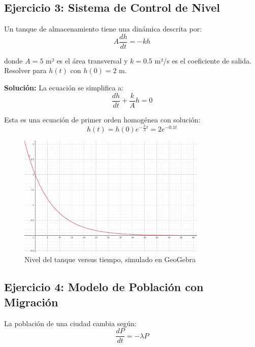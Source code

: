 \documentclass[12pt]{article}
\begin{document}
\subsection{Ejercicio 3: Sistema de Control de Nivel}

Un tanque de almacenamiento tiene una dinámica descrita por:
\begin{equation}
    A \frac{dh}{dt} = -k h
\end{equation}

donde $A = 5$ m² es el área transversal y $k = 0.5$ m²/s es el coeficiente de salida. Resolver para $h(t)$ con $h(0) = 2$ m.

\textbf{Solución:}
La ecuación se simplifica a:
\begin{equation}
    \frac{dh}{dt} + \frac{k}{A} h = 0
\end{equation}

Esta es una ecuación de primer orden homogénea con solución:
\begin{equation}
    h(t) = h(0) e^{-\frac{k}{A}t} = 2 e^{-0.1t}
\end{equation}

\begin{figure}[H]
    \centering
    \includegraphics[width=0.8\textwidth]{imagen-ejercicio3.png}
    \caption{Nivel del tanque versus tiempo, simulado en GeoGebra}
\end{figure}

\subsection{Ejercicio 4: Modelo de Población con Migración}

La población de una ciudad cambia según:
\begin{equation}
    \frac{dP}{dt} = -\lambda P
\end{equation}
\end{document}

